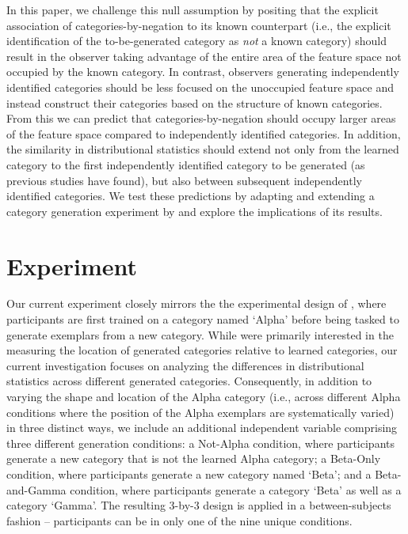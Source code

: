 \documentclass[10pt,letterpaper]{article}
\begin{document}
In this paper, we challenge this null assumption by positing that the explicit association of categories-by-negation to its known counterpart (i.e., the explicit identification of the to-be-generated category as \emph{not} a known category) should result in the observer taking advantage of the entire area of the feature space not occupied by the known category. In contrast, observers generating independently identified categories should be less focused on the unoccupied feature space and instead construct their categories based on the structure of known categories. From this we can predict that categories-by-negation should occupy larger areas of the feature space compared to independently identified categories. In addition, the similarity in distributional statistics should extend not only from the learned category to the first independently identified category to be generated (as previous studies have found), but also between subsequent independently identified categories. We test these predictions by adapting and extending a category generation experiment by \cite{conaway2017packer} and explore the implications of its results.


\section{Experiment}
Our current experiment closely mirrors the the experimental design of \cite{conaway2017packer}, where participants are first trained on a category named `Alpha' before being tasked to generate exemplars from a new category. While \cite{conaway2017packer} were primarily interested in the measuring the location of generated categories relative to learned categories, our current investigation focuses on analyzing the differences in distributional statistics across different generated categories. Consequently, in addition to varying the shape and location of the Alpha category (i.e., across different Alpha conditions where the position of the Alpha exemplars are systematically varied) in three distinct ways, we include an additional independent variable comprising three different generation conditions: a Not-Alpha condition, where participants generate a new category that is not the learned Alpha category; a Beta-Only condition, where participants generate a new category named `Beta'; and a Beta-and-Gamma condition, where participants generate a category `Beta' as well as a category `Gamma'. The resulting 3-by-3 design is applied in a between-subjects fashion -- participants can be in only one of the nine unique conditions. 
\end{document}
